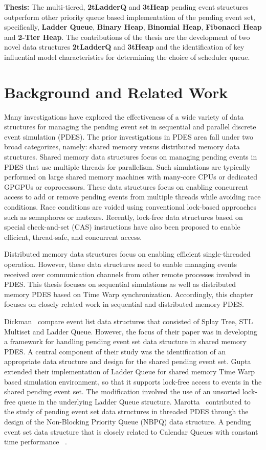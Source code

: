 \textbf{Thesis:} The multi-tiered, 
\textbf{2tLadderQ} and \textbf{3tHeap} pending event structures
outperform other priority queue based implementation of the pending event set, specifically, \textbf{Ladder Queue}, \textbf{Binary Heap}, \textbf{Binomial Heap}, \textbf{Fibonacci Heap} and \textbf{2-Tier Heap}. The contributions of the thesis are the development of two novel data structures \textbf{2tLadderQ} and \textbf{3tHeap} and the identification of key influential model characteristics for determining the choice of scheduler queue.

\chapter{Background and Related Work}

Many investigations have explored the effectiveness of a wide variety
of data structures for managing the pending event set in sequential
and parallel discrete event simulation (PDES).  The prior
investigations in PDES area fall under two broad categorizes, namely:
shared memory versus distributed memory data structures. Shared
memory data structures focus on managing pending events in PDES that
use multiple threads for parallelism.  Such simulations are typically
performed on large shared memory machines with many-core CPUs or
dedicated GPGPUs or coprocessors. These data structures focus on
enabling concurrent access to add or remove pending events from
multiple threads while avoiding race conditions.  Race conditions are
voided using conventional lock-based approaches such as semaphores or
mutexes. Recently, lock-free data structures based on special
check-and-set (CAS) instructions have also been proposed to enable
efficient, thread-safe, and concurrent access.

Distributed memory data structures focus on enabling efficient
single-threaded operation. However, these data structures need to
enable managing events received over communication channels from other
remote processes involved in PDES. This thesis focuses on sequential
simulations as well as distributed memory PDES based on Time Warp
synchronization. Accordingly, this chapter focuses on closely related
work in sequential and distributed memory PDES.

Dickman~\cite{dickman-13} compare event list data structures that
consisted of Splay Tree, STL Multiset and Ladder Queue. However, the
focus of their paper was in developing a framework for handling
pending event set data structure in shared memory PDES. A central
component of their study was the identification of an appropriate data
structure and design for the shared pending event
set. Gupta~\cite{gupta-14} extended their implementation of Ladder
Queue for shared memory Time Warp based simulation environment, so
that it supports lock-free access to events in the shared pending
event set. The modification involved the use of an unsorted lock-free
queue in the underlying Ladder Queue
structure. Marotta~\cite{marotta-16} contributed to the study of
pending event set data structures in threaded PDES through the design
of the Non-Blocking Priority Queue (NBPQ) data structure. A pending
event set data structure that is closely related to Calendar Queues
with constant time performance ~\cite{higiro2017multi}.

